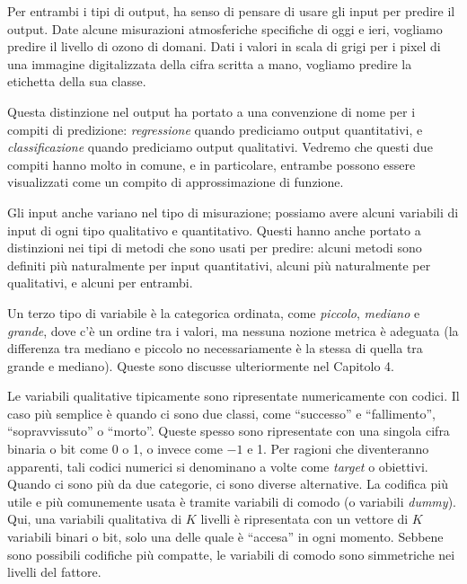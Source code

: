 \documentclass[11pt,openany]{book}
\begin{document}
Per entrambi i tipi di output, ha senso di pensare di usare gli input per predire il output. Date alcune misurazioni atmosferiche specifiche di oggi e ieri, vogliamo predire il livello di ozono di domani. Dati i valori in scala di grigi per i pixel di una immagine digitalizzata della cifra scritta a mano, vogliamo predire la etichetta della sua classe.

Questa distinzione nel output ha portato a una convenzione di nome per i compiti di predizione: {\it regressione} quando prediciamo output quantitativi, e {\it classificazione} quando prediciamo output qualitativi. Vedremo che questi due compiti hanno molto in comune, e in particolare, entrambe possono essere visualizzati come un compito di approssimazione di funzione.

Gli input anche variano nel tipo di misurazione; possiamo avere alcuni variabili di input di ogni tipo qualitativo e quantitativo. Questi hanno anche portato a distinzioni nei tipi di metodi che sono usati per predire: alcuni metodi sono definiti più naturalmente per input quantitativi, alcuni più naturalmente per qualitativi, e alcuni per entrambi.

Un terzo tipo di variabile è la categorica ordinata, come {\it piccolo}, {\it mediano} e {\it grande}, dove c'è un ordine tra i valori, ma nessuna nozione metrica è adeguata (la differenza tra mediano e piccolo no necessariamente è la stessa di quella tra grande e mediano). Queste sono discusse ulteriormente nel Capitolo 4.

Le variabili qualitative tipicamente sono ripresentate numericamente con codici. Il caso più semplice è quando ci sono due classi, come ``successo'' e ``fallimento'', ``sopravvissuto'' o ``morto''. Queste spesso sono ripresentate con una singola cifra binaria o bit come 0 o 1, o invece come $-1$ e 1. Per ragioni che diventeranno apparenti, tali codici numerici si denominano a volte come {\it target} o obiettivi. Quando ci sono più da due categorie, ci sono diverse alternative. La codifica più utile e più comunemente usata è tramite variabili di comodo (o variabili {\it dummy}). Qui, una variabili qualitativa di $K$ livelli è ripresentata con un vettore di $K$ variabili binari o bit, solo una delle quale è ``accesa'' in ogni momento. Sebbene sono possibili codifiche più compatte, le variabili di comodo sono simmetriche nei livelli del fattore.
\end{document}
